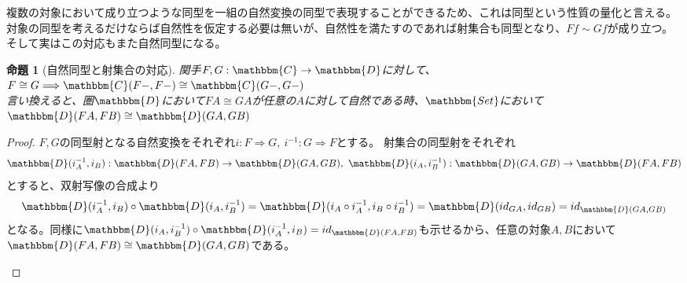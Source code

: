 \documentclass[uplatex,dvipdfmx]{jsarticle}
\newcommand{\cat}[1]{\mathbbm{#1}}
\newcommand{\arrow}{\rightarrow}
\newcommand{\functor}[3]{#1:\cat{#2}\arrow \cat{#3}}
\newcommand{\nat}[3]{#1:#2\Rightarrow #3}
\newcommand{\mor}[3]{#1:#2\arrow #3}
\newcommand{\arset}[3]{\cat{#1}(#2,#3)}
\newtheorem{proof}{証明}[section]
\newtheorem{prop}[proof]{命題}
\numberwithin{proof}{subsection}
\begin{document}
  複数の対象において成り立つような同型を一組の自然変換の同型で表現することができるため、これは同型という性質の量化と言える。
  対象の同型を考えるだけならば自然性を仮定する必要は無いが、自然性を満たすのであれば射集合も同型となり、$Ff\sim Gf$が成り立つ。そして実はこの対応もまた自然同型になる。
  \begin{prop}[自然同型と射集合の対応]
    関手$\functor{F,G}{C}{D}$に対して、
    $F\cong G\Longrightarrow\arset{C}{F-}{F-}\cong\arset{C}{G-}{G-}$\\
    言い換えると、圏$\cat{D}$において$FA\cong GA$が任意の$A$に対して自然である時、$\cat{Set}$において$\arset{D}{FA}{FB}\cong\arset{D}{GA}{GB}$
  \end{prop}
  \begin{proof}
    $F,G$の同型射となる自然変換をそれぞれ$\nat{i}{F}{G},\ \nat{i^{-1}}{G}{F}$とする。
    射集合の同型射をそれぞれ\[\mor{\arset{D}{i^{-1}_A}{i_B}}{\arset{D}{FA}{FB}}{\arset{D}{GA}{GB}},\ \mor{\arset{D}{i_A}{i^{-1}_B}}{\arset{D}{GA}{GB}}{\arset{D}{FA}{FB}}\]とすると、双射写像の合成より\[\arset{D}{i^{-1}_A}{i_B}\circ\arset{D}{i_A}{i^{-1}_B}=\arset{D}{i_A\circ i^{-1}_A}{i_B\circ i^{-1}_B}=\arset{D}{id_{GA}}{id_{GB}}=id_{\arset{D}{GA}{GB}}\]となる。同様に$\arset{D}{i_A}{i^{-1}_B}\circ\arset{D}{i^{-1}_A}{i_B}=id_{\arset{D}{FA}{FB}}$も示せるから、任意の対象$A,B$において$\arset{D}{FA}{FB}\cong\arset{D}{GA}{GB}$である。
    \begin{center}
\end{center}
\end{proof}
\end{document}
